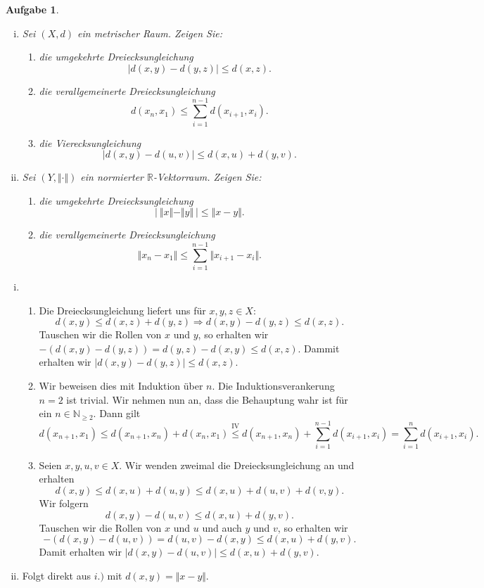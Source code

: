 \documentclass[a4paper, 20]{exam}
\newtheorem{ex}{Aufgabe}
\newcommand\RR{\mathbb{R}}
\newcommand\NN{\mathbb{N}}
\begin{document}
\begin{ex}
\begin{enumerate}[i.)]
\item Sei $(X,d)$ ein metrischer Raum. Zeigen Sie:
\begin{enumerate}
\item
die umgekehrte Dreiecksungleichung
$$ \vert d(x,y) - d(y, z) \vert \leq d(x, z).$$
\item
die verallgemeinerte Dreiecksungleichung
$$ d(x_n, x_1) \leq \sum_{i=1}^{n-1} d(x_{i+1}, x_i) .$$
\item
die Vierecksungleichung
$$ \vert d(x,y) - d(u,v) \vert \leq d(x,u) + d(y,v) .$$
\end{enumerate}

\item Sei $(Y, \Vert \cdot \Vert)$ ein normierter $\RR$-Vektorraum. Zeigen Sie:
\begin{enumerate}
\item
die umgekehrte Dreiecksungleichung
$$ \big\vert \ \Vert x \Vert - \Vert y \Vert \ \big\vert \leq \Vert x -y \Vert .$$
\item
die verallgemeinerte Dreiecksungleichung
$$ \Vert x_n - x_1 \Vert \leq \sum_{i=1}^{n-1} \Vert x_{i+1} - x_i \Vert .$$
\end{enumerate}
\end{enumerate}
\end{ex}
\begin{solution}
\begin{enumerate}[i.)]
\item
\begin{enumerate}
\item
Die Dreiecksungleichung liefert uns f\"ur $x,y,z \in X$:
$$d(x, y) \leq d(x, z) + d(y,z) \Rightarrow d(x,y) - d(y,z) \leq d(x,z) .$$
Tauschen wir die Rollen von $x$ und $y$, so erhalten wir $-(d(x,y) - d(y,z)) = d(y,z) - d(x,y) \leq d(x,z)$. Dammit erhalten wir $ \vert d(x,y) - d(y, z) \vert \leq d(x, z).$
\item
Wir beweisen dies mit Induktion \"uber $n$. Die Induktionsverankerung $n=2$ ist trivial. Wir nehmen nun an, dass die Behauptung wahr ist f\"ur ein $n\in \NN_{\geq 2}$. Dann gilt
$$ d(x_{n+1}, x_1) \leq d(x_{n+1}, x_n) + d(x_n, x_1) 
\stackrel{\text{IV}}{\leq} d(x_{n+1}, x_n) + \sum_{i=1}^{n-1} d(x_{i+1}, x_i) = \sum_{i=1}^{n} d(x_{i+1}, x_i).$$ 
\item
Seien $x,y,u, v \in X$. Wir wenden zweimal die Dreiecksungleichung an und erhalten
$$ d(x,y) \leq d(x,u) + d(u,y) \leq  d(x,u) + d(u,v) + d(v, y).$$
Wir folgern
$$ d(x,y) - d(u, v) \leq d(x,u) + d(y, v). $$
Tauschen wir die Rollen von $x$ und $u$ und auch $y$ und $v$, so erhalten wir
$$- (d(x,y) - d(u, v)) = d(u,v) - d(x,y) \leq  d(x,u) + d(y, v).$$
Damit erhalten wir $\vert d(x,y) - d(u,v) \vert \leq d(x,u) + d(y,v)$.
\end{enumerate}
\item
Folgt direkt aus $i.)$ mit $d(x,y)= \Vert x -y \Vert$.
\end{enumerate}
\end{solution}
\end{document}
